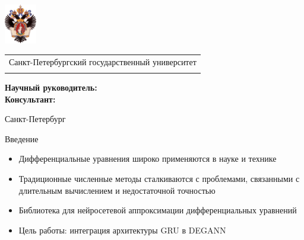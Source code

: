 \documentclass
  [ russian
  , aspectratio=1610 %
  ] {beamer}
\title[GRU в DEGANN]{\my@title@title@ru}
\author[\my@title@author@ru]{\my@title@author@ru, группа \academicGroup}
\institute[СПбГУ]{}
\date[10 декабря 2024 г.]{}
\makeatletter
\newcommand{\advisorChair}{\my@title@chair@ru}
\newcommand{\supervisor}{\my@title@supervisor@ru}
\newcommand{\supervisorPosition}{\my@title@supervisorPosition@ru}
\newcommand{\consultant}{\my@title@consultant@ru}
\newcommand{\consultantPosition}{\my@title@consultantPosition@ru}
\newcommand{\defenseYear}{\my@title@year@ru}
\makeatother
\begin{document}
{
\begin{frame}
    \includegraphics[width=1.4cm]{figures/SPbGU_Logo.png}
    \vspace{-35pt}
    \hspace{-10pt}
    \begin{center}
        \begin{tabular}{c}
            \scriptsize{Санкт-Петербургский государственный университет} \\
            \scriptsize{\advisorChair}
        \end{tabular}
        \titlepage
    \end{center}

    \btVFill

    {\scriptsize
        \textbf{Научный руководитель:}  \supervisorPosition~\supervisor \\
        \textbf{Консультант:}  \consultantPosition~\consultant \\
    }
    \makeatother
    \begin{center}
        \vspace{5pt}
        \scriptsize{Санкт-Петербург\\ \defenseYear}
    \end{center}
\end{frame}
}

\begin{frame}{Введение}
    \begin{itemize}
        \item Дифференциальные уравнения широко применяются в науке и технике
        \item Традиционные численные методы сталкиваются с проблемами, связанными с длительным вычислением и недостаточной точностью
        \item Библиотека для нейросетевой аппроксимации дифференциальных уравнений
        \item Цель работы: интеграция архитектуры GRU в DEGANN
    \end{itemize}
\end{frame}
\end{document}
